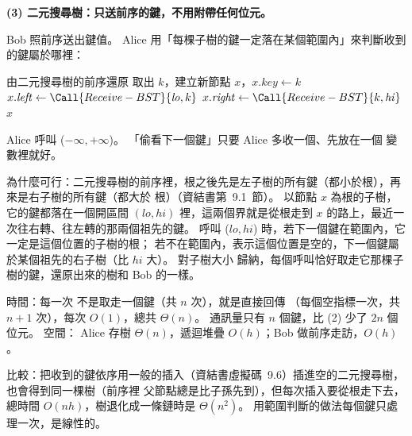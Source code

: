 \begin{pastsoln}
\textbf{(3) 二元搜尋樹：只送前序的鍵，不用附帶任何位元。}

Bob 照前序送出鍵值。 Alice 用「每棵子樹的鍵一定落在某個範圍內」來判斷收到的鍵屬於哪裡：

\begin{pseudo}{由二元搜尋樹的前序還原}
        \State \Return \NIL {}
    \EndIf
    \State 取出 $k$，建立新節點 $x$，$x.\mathit{key} \gets k$
    \State $x.\mathit{left} \gets \Call{Receive-BST}{\mathit{lo}, k}$
    \State $x.\mathit{right} \gets \Call{Receive-BST}{k, \mathit{hi}}$
    \State \Return $x$
\EndFunction
\end{pseudo}
Alice 呼叫 ($-\infty, +\infty$)。 「偷看下一個鍵」只要 Alice 多收一個、先放在一個
變數裡就好。

為什麼可行：二元搜尋樹的前序裡，根之後先是左子樹的所有鍵（都小於根），再來是右子樹的所有鍵（都大於
根）（資結書第~9.1~節）。 以節點 $x$ 為根的子樹，它的鍵都落在一個開區間 $(\mathit{lo}, \mathit{hi})$
裡，這兩個界就是從根走到 $x$ 的路上，最近一次往右轉、往左轉的那兩個祖先的鍵。 呼叫
($\mathit{lo}, \mathit{hi}$) 時，若下一個鍵在範圍內，它一定是這個位置的子樹的根；
若不在範圍內，表示這個位置是空的，下一個鍵屬於某個祖先的右子樹（比 $\mathit{hi}$ 大）。 對子樹大小
歸納，每個呼叫恰好取走它那棵子樹的鍵，還原出來的樹和 Bob 的一樣。

時間：每一次  不是取走一個鍵（共 $n$ 次），就是直接回傳 \NIL（每個空指標一次，共
$n + 1$ 次），每次 $O(1)$，總共 $\Theta(n)$。 通訊量只有 $n$ 個鍵，比 (2) 少了 $2n$ 個位元。 空間：
Alice 存樹 $\Theta(n)$，遞迴堆疊 $O(h)$；Bob 做前序走訪，$O(h)$。

比較：把收到的鍵依序用一般的插入（資結書虛擬碼~9.6）插進空的二元搜尋樹，也會得到同一棵樹（前序裡
父節點總是比子孫先到），但每次插入要從根走下去，總時間 $O(nh)$，樹退化成一條鏈時是 $\Theta(n^2)$。
用範圍判斷的做法每個鍵只處理一次，是線性的。
\end{pastsoln}
